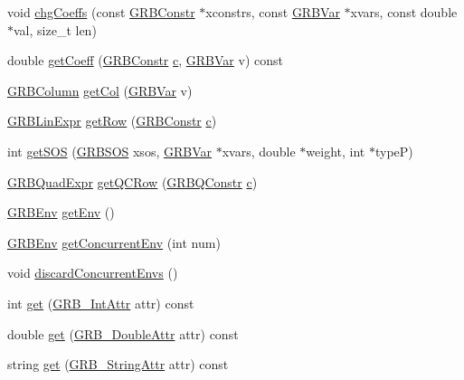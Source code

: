 \begin{DoxyCompactItemize}
\item 
void \hyperlink{classGRBModel_a3e467e1a46fd96658f5fb4483f69c561}{chg\+Coeffs} (const \hyperlink{classGRBConstr}{G\+R\+B\+Constr} $\ast$xconstrs, const \hyperlink{classGRBVar}{G\+R\+B\+Var} $\ast$xvars, const double $\ast$val, size\+\_\+t len)
\item 
double \hyperlink{classGRBModel_a7a70806a3c68d0bff5a232914eaedea7}{get\+Coeff} (\hyperlink{classGRBConstr}{G\+R\+B\+Constr} \hyperlink{IntArray2bmp_8h_ae9d8014c37dbf37873bdee6b8497a065}{c}, \hyperlink{classGRBVar}{G\+R\+B\+Var} v) const 
\item 
\hyperlink{classGRBColumn}{G\+R\+B\+Column} \hyperlink{classGRBModel_aab9b448afc20566ab7945548f4b05bf9}{get\+Col} (\hyperlink{classGRBVar}{G\+R\+B\+Var} v)
\item 
\hyperlink{classGRBLinExpr}{G\+R\+B\+Lin\+Expr} \hyperlink{classGRBModel_a8f65fe39e6a6ede1387ea977cc12ed66}{get\+Row} (\hyperlink{classGRBConstr}{G\+R\+B\+Constr} \hyperlink{IntArray2bmp_8h_ae9d8014c37dbf37873bdee6b8497a065}{c})
\item 
int \hyperlink{classGRBModel_a58b991efcdc6f6bb179a1c267bf12f42}{get\+S\+OS} (\hyperlink{classGRBSOS}{G\+R\+B\+S\+OS} xsos, \hyperlink{classGRBVar}{G\+R\+B\+Var} $\ast$xvars, double $\ast$weight, int $\ast$typeP)
\item 
\hyperlink{classGRBQuadExpr}{G\+R\+B\+Quad\+Expr} \hyperlink{classGRBModel_a8824331442db733b68bac9745fb38317}{get\+Q\+C\+Row} (\hyperlink{classGRBQConstr}{G\+R\+B\+Q\+Constr} \hyperlink{IntArray2bmp_8h_ae9d8014c37dbf37873bdee6b8497a065}{c})
\item 
\hyperlink{classGRBEnv}{G\+R\+B\+Env} \hyperlink{classGRBModel_aa5dfd23b74bf0936a22a5b5f58a7c34b}{get\+Env} ()
\item 
\hyperlink{classGRBEnv}{G\+R\+B\+Env} \hyperlink{classGRBModel_ab285776b9bb6b59bd31f7f38bc371909}{get\+Concurrent\+Env} (int num)
\item 
void \hyperlink{classGRBModel_a19b5f355d4c80da959bfa597e268d3d0}{discard\+Concurrent\+Envs} ()
\item 
int \hyperlink{classGRBModel_a8fe021a9f145ee918ab1a7a1b326aa20}{get} (\hyperlink{gurobi__c_09_09_8h_acfc136f6822be3d3e36ac84bd76b0900}{G\+R\+B\+\_\+\+Int\+Attr} attr) const 
\item 
double \hyperlink{classGRBModel_ab088618084ec2f3d81dbcba0cdafb03b}{get} (\hyperlink{gurobi__c_09_09_8h_a2f43cc28447ce1778973a1f7961e8180}{G\+R\+B\+\_\+\+Double\+Attr} attr) const 
\item 
string \hyperlink{classGRBModel_a95f9ec06673910a083b6ff76551172d2}{get} (\hyperlink{gurobi__c_09_09_8h_a08ffa110d9b1684d689ae53300bb7ec1}{G\+R\+B\+\_\+\+String\+Attr} attr) const 

\end{DoxyCompactItemize}
